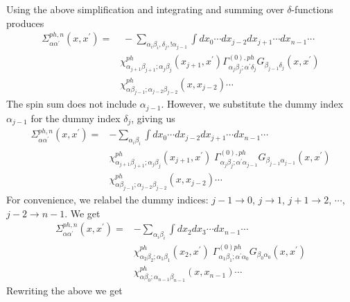 Using the above simplification and integrating and summing over
$\delta$-functions produces
\begin{equation}
\begin{split}
\Sigma^{ph,n}_{\alpha \alpha^{\prime}}(x,x^{\prime})
= &  \; - \sum_{\alpha_i \beta_i, \delta_j, !\alpha_{j-1}}
\int dx_0 \cdots dx_{j-2} dx_{j+1} \cdots dx_{n-1} \cdots
\\
& \chi^{ph}_{\alpha_{j+1}\beta_{j+1}; \alpha_j \beta_j}(x_{j+1},x^{\prime})
\Gamma^{(0),ph}_{\alpha_j \beta_j;\alpha^{\prime}\delta_j}
G_{\beta_{j-1}\delta_j}(x,x^{\prime}) 
\\
& \chi^{ph}_{\alpha \beta_{j-1}; \alpha_{j-2} \beta_{j-2}}(x,x_{j-2}) \cdots
\end{split}
\end{equation}
The spin sum does not include $\alpha_{j-1}$.
However, we substitute the dummy index $\alpha_{j-1}$
for the dummy index $\delta_j$, giving us
\begin{equation}
\begin{split}
\Sigma^{ph,n}_{\alpha \alpha^{\prime}}(x,x^{\prime})
= & - \sum_{\alpha_i \beta_i} 
\int dx_0 \cdots dx_{j-2} dx_{j+1} \cdots dx_{n-1} \cdots
\\
& \chi^{ph}_{\alpha_{j+1} \beta_{j+1}; \alpha_j \beta_j}(x_{j+1},x^{\prime})
\;
\Gamma^{(0),ph}_{\alpha_j \beta_j; \alpha^{\prime} \alpha_{j-1}}
 G_{\beta_{j-1}\alpha_{j-1}}(x,x^{\prime})
\\
& 
\chi^{ph}_{\alpha \beta_{j-1}; \alpha_{j-2} \beta_{j-2}}(x, x_{j-2}) \cdots 
\end{split}
\end{equation}
For convenience, we relabel the dummy indices:
$j - 1 \to 0$, $j \to 1$, $j + 1 \to 2$, $\cdots$,
$j - 2 \to n-1$.  We get
\begin{equation}
\begin{split}
\Sigma^{ph,n}_{\alpha \alpha^{\prime}}(x,x^{\prime})
= & - \sum_{\alpha_i \beta_i} 
\int dx_2 dx_3 \cdots dx_{n-1} \cdots
\\
& \chi^{ph}_{\alpha_2 \beta_2; \alpha_1 \beta_1}(x_2,x^{\prime})
\;
\Gamma^{(0)ph}_{\alpha_1 \beta_1; \alpha^{\prime} \alpha_0}
 G_{\beta_0\alpha_0}(x,x^{\prime})
\\
& 
\chi^{ph}_{\alpha \beta_0; \alpha_{n-1} \beta_{n-1}}(x, x_{n-1}) \cdots 
\end{split}
\end{equation}
Rewriting the above
we get
